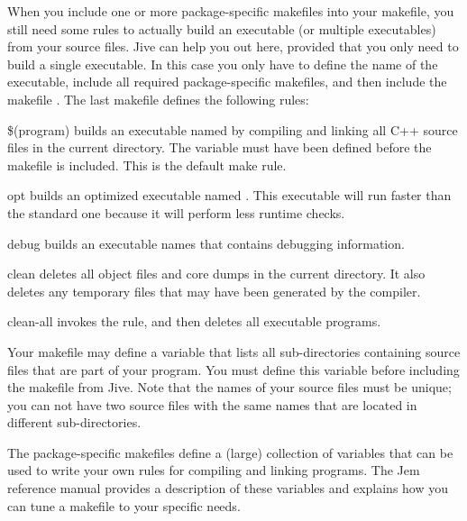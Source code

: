 When you include one or more package-specific makefiles into your
makefile, you still need some rules to actually build an executable (or
multiple executables) from your source files. Jive can help you out here,
provided that you only need to build a single executable. In this
case you only have to define the name of the executable, include all
required package-specific makefiles, and then include the makefile
. The last makefile defines the
following rules:
\begin{Description}[\Code]

\item[\$(program)] builds an executable named  by
  compiling and linking all C++ source files in the current directory.
  The variable  must have been defined before the makefile
   is included. This is the
  default make rule.

\item[opt] builds an optimized executable named
  . This executable will run faster than the
  standard one because it will perform less runtime checks.

\item[debug] builds an executable names  that
  contains debugging information.

\item[clean] deletes all object files and core dumps in the current
  directory. It also deletes any temporary files that may have been
  generated by the compiler.

\item[clean-all] invokes the  rule, and then deletes all
  executable programs.

\end{Description}

Your makefile may define a variable  that lists all
sub-directories containing source files that are part of your program.
You must define this variable before including the makefile
 from Jive. Note that the names of your source files must
be unique; you can not have two source files with the same names that are
located in different sub-directories.

The package-specific makefiles define a (large) collection of variables
that can be used to write your own rules for compiling and linking
programs. The Jem reference manual provides a description of these
variables and explains how you can tune a makefile to your specific
needs.

